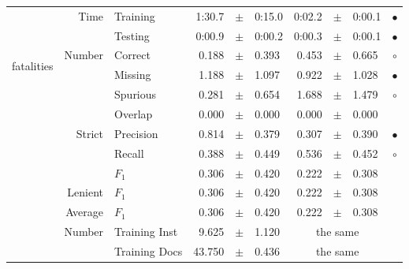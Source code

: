 \begin{longtable}{|r|r|l||rcl|rcl|c|}
\cline{2-10} & \multirow{2}{*}{      Time} &        Training &      1:30.7 &  $\pm$  &      0:15.0 &      0:02.2 &  $\pm$  &      0:00.1 & $\bullet$ \\
\cline{3-10} &                             &         Testing &      0:00.9 &  $\pm$  &      0:00.2 &      0:00.3 &  $\pm$  &      0:00.1 & $\bullet$ \\
\hline
\hline
\multirow{11}{*}{\begin{sideways}fatalities\end{sideways} }
             & \multirow{4}{*}{    Number} &         Correct &       0.188 &  $\pm$  &       0.393 &       0.453 &  $\pm$  &       0.665 & $\circ$ \\
\cline{3-10} &                             &         Missing &       1.188 &  $\pm$  &       1.097 &       0.922 &  $\pm$  &       1.028 & $\bullet$ \\
\cline{3-10} &                             &        Spurious &       0.281 &  $\pm$  &       0.654 &       1.688 &  $\pm$  &       1.479 & $\circ$ \\
\cline{3-10} &                             &         Overlap &       0.000 &  $\pm$  &       0.000 &       0.000 &  $\pm$  &       0.000 &  \\
\cline{2-10} & \multirow{3}{*}{    Strict} &       Precision &       0.814 &  $\pm$  &       0.379 &       0.307 &  $\pm$  &       0.390 & $\bullet$ \\
\cline{3-10} &                             &          Recall &       0.388 &  $\pm$  &       0.449 &       0.536 &  $\pm$  &       0.452 & $\circ$ \\
\cline{3-10} &                             &           $F_1$ &       0.306 &  $\pm$  &       0.420 &       0.222 &  $\pm$  &       0.308 &  \\
\cline{2-10} &                     Lenient &           $F_1$ &       0.306 &  $\pm$  &       0.420 &       0.222 &  $\pm$  &       0.308 &  \\
\cline{2-10} &                     Average &           $F_1$ &       0.306 &  $\pm$  &       0.420 &       0.222 &  $\pm$  &       0.308 &  \\
\cline{2-10} & \multirow{2}{*}{    Number} &   Training Inst &       9.625 &  $\pm$  &       1.120 &    \multicolumn{3}{c|}{the same}         &  \\
\cline{3-10} &                             &   Training Docs &      43.750 &  $\pm$  &       0.436 &    \multicolumn{3}{c|}{the same}         &  \\

\end{longtable}
